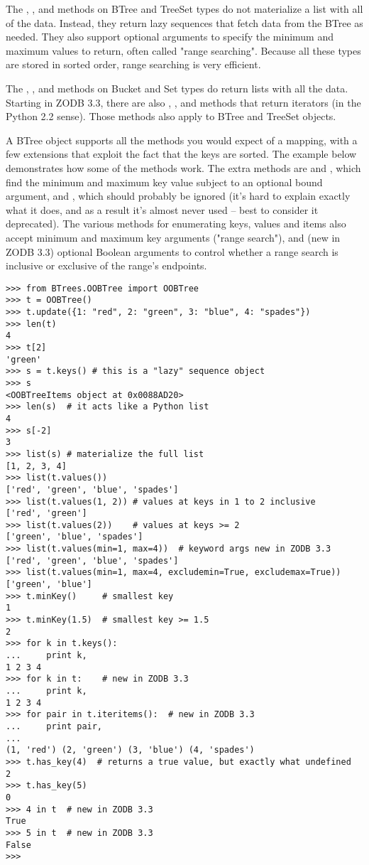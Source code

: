 The , , and 
methods on BTree and TreeSet types do not materialize a list with all
of the data.  Instead, they return lazy sequences that fetch data
from the BTree as needed.  They also support optional arguments to
specify the minimum and maximum values to return, often called "range
searching".  Because all these types are stored in sorted order, range
searching is very efficient.

The , , and 
methods on Bucket and Set types do return lists with all the data.
Starting in ZODB 3.3, there are also ,
, and  methods that
return iterators (in the Python 2.2 sense).  Those methods also apply to
BTree and TreeSet objects.

A BTree object supports all the methods you would expect of a mapping,
with a few extensions that exploit the fact that the keys are sorted.
The example below demonstrates how some of the methods work.  The
extra methods are  and , which
find the minimum and maximum key value subject to an optional bound
argument, and , which should probably be ignored
(it's hard to explain exactly what it does, and as a result it's
almost never used -- best to consider it deprecated).  The various
methods for enumerating keys, values and items also accept minimum
and maximum key arguments ("range search"), and (new in ZODB 3.3)
optional Boolean arguments to control whether a range search is
inclusive or exclusive of the range's endpoints.

\begin{verbatim}
>>> from BTrees.OOBTree import OOBTree
>>> t = OOBTree()
>>> t.update({1: "red", 2: "green", 3: "blue", 4: "spades"})
>>> len(t)
4
>>> t[2]
'green'
>>> s = t.keys() # this is a "lazy" sequence object
>>> s
<OOBTreeItems object at 0x0088AD20>
>>> len(s)  # it acts like a Python list
4
>>> s[-2]
3
>>> list(s) # materialize the full list
[1, 2, 3, 4]
>>> list(t.values())
['red', 'green', 'blue', 'spades']
>>> list(t.values(1, 2)) # values at keys in 1 to 2 inclusive
['red', 'green']
>>> list(t.values(2))    # values at keys >= 2
['green', 'blue', 'spades']
>>> list(t.values(min=1, max=4))  # keyword args new in ZODB 3.3
['red', 'green', 'blue', 'spades']
>>> list(t.values(min=1, max=4, excludemin=True, excludemax=True))
['green', 'blue']
>>> t.minKey()     # smallest key
1
>>> t.minKey(1.5)  # smallest key >= 1.5
2
>>> for k in t.keys():
...     print k,
1 2 3 4
>>> for k in t:    # new in ZODB 3.3
...     print k,
1 2 3 4
>>> for pair in t.iteritems():  # new in ZODB 3.3
...     print pair,
...
(1, 'red') (2, 'green') (3, 'blue') (4, 'spades')
>>> t.has_key(4)  # returns a true value, but exactly what undefined
2
>>> t.has_key(5)
0
>>> 4 in t  # new in ZODB 3.3
True
>>> 5 in t  # new in ZODB 3.3
False
>>>

\end{verbatim}

